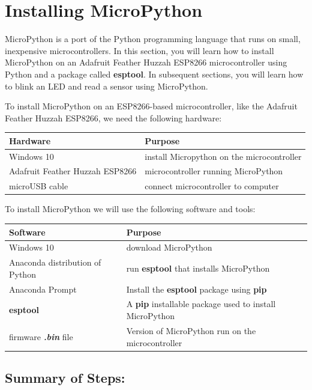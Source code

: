 \documentclass{book}
\begin{document}
    \section{Installing MicroPython}\label{installing-micropython}

    MicroPython is a port of the Python programming language that runs on
small, inexpensive microcontrollers. In this section, you will learn how
to install MicroPython on an Adafruit Feather Huzzah ESP8266
microcontroller using Python and a package called \textbf{esptool}. In
subsequent sections, you will learn how to blink an LED and read a
sensor using MicroPython.

    To install MicroPython on an ESP8266-based microcontroller, like the
Adafruit Feather Huzzah ESP8266, we need the following hardware:

\begin{longtable}[]{@{}ll@{}}
\toprule
Hardware & Purpose\tabularnewline
\midrule
\endhead
Windows 10 & install Micropython on the microcontroller\tabularnewline
Adafruit Feather Huzzah ESP8266 & microcontroller running
MicroPython\tabularnewline
microUSB cable & connect microcontroller to computer\tabularnewline
\bottomrule
\end{longtable}

To install MicroPython we will use the following software and tools:

\begin{longtable}[]{@{}ll@{}}
\toprule
Software & Purpose\tabularnewline
\midrule
\endhead
Windows 10 & download MicroPython\tabularnewline
Anaconda distribution of Python & run \textbf{esptool} that installs
MicroPython\tabularnewline
Anaconda Prompt & Install the \textbf{esptool} package using
\textbf{pip}\tabularnewline
\textbf{esptool} & A \textbf{pip} installable package used to install
MicroPython\tabularnewline
firmware \textbf{\emph{.bin}} file & Version of MicroPython run on the
microcontroller\tabularnewline
\bottomrule
\end{longtable}

    \subsection{Summary of Steps:}\label{summary-of-steps}
\end{document}
